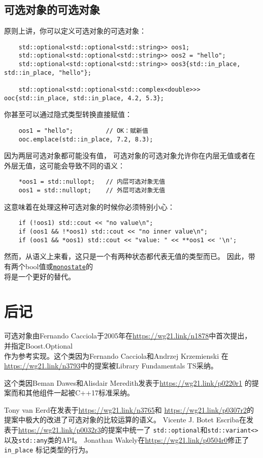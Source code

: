 \subsection{可选对象的可选对象}
原则上讲，你可以定义可选对象的可选对象：
\begin{lstlisting}
    std::optional<std::optional<std::string>> oos1;
    std::optional<std::optional<std::string>> oos2 = "hello";
    std::optional<std::optional<std::string>> oos3{std::in_place, std::in_place, "hello"};

    std::optional<std::optional<std::complex<double>>> ooc{std::in_place, std::in_place, 4.2, 5.3};
\end{lstlisting}
你甚至可以通过隐式类型转换直接赋值：
\begin{lstlisting}
    oos1 = "hello";         // OK：赋新值
    ooc.emplace(std::in_place, 7.2, 8.3);
\end{lstlisting}
因为两层可选对象都可能没有值，
可选对象的可选对象允许你在内层无值或者在外层无值，这可能会导致不同的语义：
\begin{lstlisting}
    *oos1 = std::nullopt;   // 内层可选对象无值
    oos1 = std::nullopt;    // 外层可选对象无值
\end{lstlisting}
这意味着在处理这种可选对象的时候你必须特别小心：
\begin{lstlisting}
    if (!oos1) std::cout << "no value\n";
    if (oos1 && !*oos1) std::cout << "no inner value\n";
    if (oos1 && *oos1) std::cout << "value: " << **oos1 << '\n';
\end{lstlisting}
然而，从语义上来看，这只是一个有两种状态都代表无值的类型而已。
因此，带有两个bool值或\hyperref[ch16.2.1]{\texttt{monostate}}的\\
将是一个更好的替代。

\section{后记}
可选对象由Fernando Cacciola于2005年在\url{https://wg21.link/n1878}中首次提出，
并指定Boost.Optional\\
作为参考实现。这个类因为Fernando Cacciola和Andrzej Krzemienski
在\url{https://wg21.link/n3793}中的提案被Library Fundamentals TS采纳。

这个类因Beman Dawes和Alisdair Meredith发表于\url{https://wg21.link/p0220r1}
的提案而和其他组件一起被C++17标准采纳。

Tony van Eerd在发表于\url{https://wg21.link/n3765}和
\url{https://wg21.link/p0307r2}的提案中极大的改进了可选对象的比较运算的语义。
Vicente J. Botet Escriba在发表于\url{https://wg21.link/p0032r3}的提案中统一了
\texttt{std::optional}和\texttt{std::variant<>}以及\texttt{std::any}类的API。
Jonathan Wakely在\url{https://wg21.link/p0504r0}修正了\texttt{in\_place}
标记类型的行为。